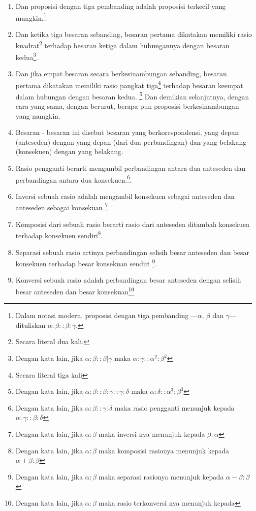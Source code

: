 \documentclass[a4paper]{book}
\begin{document}
\begin{enumerate}
\item Dan proposisi dengan tiga pembanding adalah proposisi 
terkecil yang mungkin.\footnote{Dalam notasi modern, proposisi dengan 
tiga pembanding ---$\alpha$, $\beta$ dan $\gamma$--- dituliskan $\alpha:\beta::\beta:\gamma$.}
\item Dan ketika tiga besaran sebanding, besaran pertama dikatakan 
memiliki rasio kuadrat\footnote{Secara literal dua kali.} terhadap besaran ketiga dalam hubungannya
dengan besaran kedua\footnote{Dengan kata lain, jika 
$\alpha:\beta::\beta|\gamma$ maka $\alpha:\gamma::\alpha^2:\beta^2$}.
\item Dan jika empat besaran secara berkesinambungan sebanding, besaran pertama
dikatakan memiliki rasio pangkat tiga\footnote{Secara literal tiga 
kali} terhadap besaran keempat dalam hubungan dengan besaran kedua.
\footnote{Dengan kata lain, jika $\alpha : \beta :: \beta : \gamma 
:: \gamma: \delta$ maka $\alpha:\delta :: \alpha^3:\beta^3$} Dan demikian 
selanjutnya, dengan cara yang sama, dengan berurut, berapa pun proposisi 
berkesinambungan yang mungkin.
\item Besaran - besaran ini disebut besaran yang berkorespondensi, yang depan (anteseden) 
dengan yang depan (dari dua perbandingan) dan yang belakang (konsekuen) 
dengan yang belakang.
\item Rasio pengganti berarti mengambil perbandingan antara dua anteseden dan
perbandingan antara dua konsekuen.\footnote{Dengan kata lain, jika
$\alpha:\beta::\gamma:\delta$ maka rasio pengganti menunjuk kepada
$\alpha:\gamma::\beta:\delta$}.
\item Inversi sebuah rasio adalah mengambil konsekuen sebagai anteseden dan
anteseden sebagai konsekuan \footnote{Dengan kata lain, jika $\alpha :\beta$
maka inversi nya menunjuk kepada $\beta : \alpha$}
\item Komposisi dari sebuah rasio berarti rasio dari anteseden ditambah 
konsekuen terhadap konsekuen sendiri\footnote{Dengan kata lain, jika 
$\alpha:\beta$ maka komposisi rasionya menunjuk kepada 
$\alpha + \beta : \beta$}.
\item Separasi sebuah rasio artinya perbandingan selisih besar anteseden dan 
besar konsekuen terhadap besar konsekuan sendiri
\footnote{Dengan kata lain, jika
$\alpha:\beta$ maka separasi rasionya menunjuk kepada $\alpha - \beta: \beta$}.
\item Konversi sebuah rasio adalah perbandingan besar anteseden dengan 
selisih besar anteseden dan besar konsekuan\footnote{Dengan kata lain, jika
$\alpha:\beta$ maka rasio terkonversi nya menunjuk kepada 
}
\end{enumerate}
\end{document}
